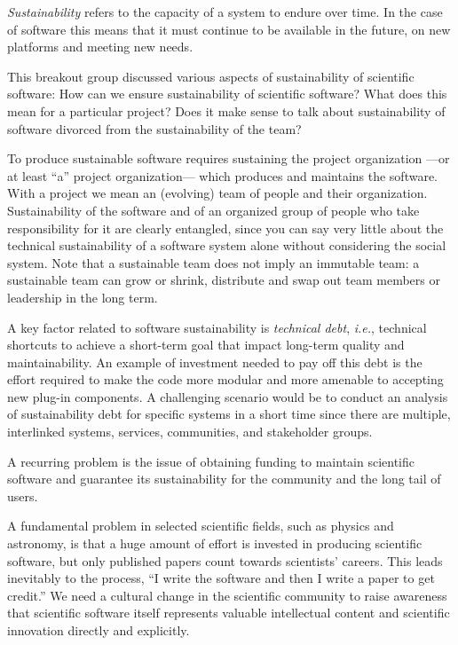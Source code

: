 \documentclass[a4paper,UKenglish]{dagrep}
\newcommand{\ie}{\emph{i.e.},\xspace}
\begin{document}
\emph{Sustainability} refers to the capacity of a system to endure over time. In the case of software this means that it must continue to be available in the future, on new platforms and meeting new needs.

This breakout group discussed various aspects of sustainability of scientific software:
How can we ensure sustainability of scientific software? What does this mean for a particular project? Does it make sense to talk about sustainability of software divorced from the sustainability of the team?

To produce sustainable software requires sustaining the project organization ---or at least ``a'' project organization--- which produces and maintains the software. With a project we mean an (evolving) team of people and their organization.
Sustainability of the software and of an organized group of people who take responsibility for it are clearly entangled, since you can say very little about the technical sustainability of a software system alone without considering the social system. Note that a sustainable team does not imply an immutable team: a sustainable team can grow or shrink, distribute and swap out team members or leadership in the long term. 

A key factor related to software sustainability is \emph{technical debt}, \ie technical shortcuts to achieve a short-term goal that impact long-term quality and maintainability.
An example of investment needed to pay off this debt is the effort required to make the code more modular and more amenable to accepting new plug-in components.
A challenging scenario would be to conduct an analysis of sustainability debt for specific systems in a short time since there are multiple, interlinked systems, services, communities, and stakeholder groups.

A recurring problem is the issue of obtaining funding to maintain scientific software and guarantee its sustainability for the community and the long tail of users.



A fundamental problem in selected scientific fields, such as physics and astronomy, is that a huge amount of effort is invested in producing scientific software, but only published papers count towards scientists' careers. This leads inevitably to the process, ``I write the software and then I write a paper to get credit.'' We need a cultural change in the scientific community to raise awareness that scientific software itself represents valuable intellectual content and scientific innovation directly and explicitly.
\end{document}
